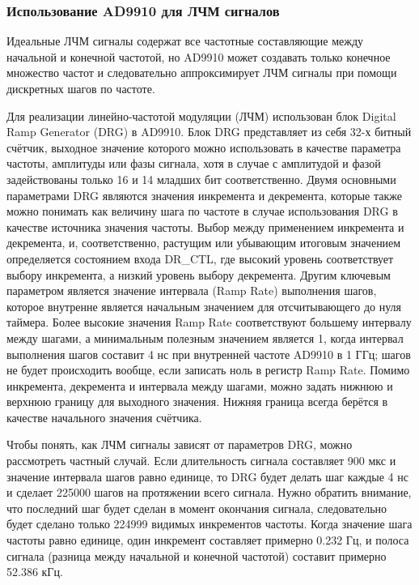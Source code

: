\documentclass[rusmathsym, eqnumwithinsec, amspack, hyperref]{bomgost}
\begin{document}
\subsubsection{Использование AD9910 для ЛЧМ сигналов}

Идеальные ЛЧМ сигналы содержат все частотные составляющие между начальной и конечной частотой, но AD9910 может создавать только конечное множество частот и следовательно аппроксимирует ЛЧМ сигналы при помощи дискретных шагов по частоте.

Для реализации линейно-частотой модуляции (ЛЧМ) использован блок Digital Ramp Generator (DRG) в AD9910. Блок DRG представляет из себя 32-х битный счётчик, выходное значение которого можно использовать в качестве параметра частоты, амплитуды или фазы сигнала, хотя в случае с амплитудой и фазой задействованы только 16 и 14 младших бит соответственно. Двумя основными параметрами DRG являются значения инкремента и декремента, которые также можно понимать как величину шага по частоте в случае использования DRG в качестве источника значения частоты. Выбор между применением инкремента и декремента, и, соответственно, растущим или убывающим итоговым значением определяется состоянием входа DR\_CTL, где высокий уровень соответствует выбору инкремента, а низкий уровень выбору декремента. Другим ключевым параметром является значение интервала (Ramp Rate) выполнения шагов, которое внутренне является начальным значением для отсчитывающего до нуля таймера. Более высокие значения Ramp Rate соответствуют большему интервалу между шагами, а минимальным полезным значением является 1, когда интервал выполнения шагов составит 4 нс при внутренней частоте AD9910 в 1 ГГц; шагов не будет происходить вообще, если записать ноль в регистр Ramp Rate. Помимо инкремента, декремента и интервала между шагами, можно задать нижнюю и верхнюю границу для выходного значения. Нижняя граница всегда берётся в качестве начального значения счётчика.

Чтобы понять, как ЛЧМ сигналы зависят от параметров DRG, можно рассмотреть частный случай. Если длительность сигнала составляет 900 мкс и значение интервала шагов равно единице, то DRG будет делать шаг каждые 4 нс и сделает 225000 шагов на протяжении всего сигнала. Нужно обратить внимание, что последний шаг будет сделан в момент окончания сигнала, следовательно будет сделано только 224999 видимых инкрементов частоты. Когда значение шага частоты равно единице, один инкремент составляет примерно 0.232 Гц, и полоса сигнала (разница между начальной и конечной частотой) составит примерно 52.386 кГц.
\end{document}

